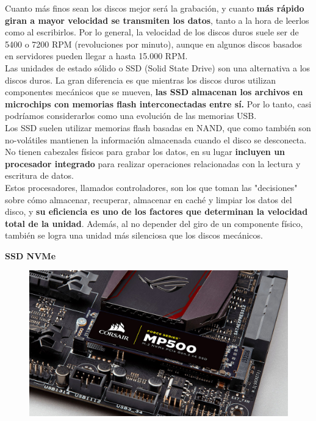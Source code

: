 \documentclass[10pt,letterpaper]{article}
\begin{document}
\begin{justify}
	\noindent
	Cuanto más finos sean los discos mejor será la grabación, y cuanto \textbf{más rápido giran a mayor velocidad se transmiten los datos}, tanto a la hora de leerlos como al escribirlos. Por lo general, la velocidad de los discos duros suele ser de 5400 o 7200 RPM (revoluciones por minuto), aunque en algunos discos basados en servidores pueden llegar a hasta 15.000 RPM. \\
	
	\noindent
	Las unidades de estado sólido o SSD (Solid State Drive) son una alternativa a los discos duros. La gran diferencia es que mientras los discos duros utilizan componentes mecánicos que se mueven, \textbf{las SSD almacenan los archivos en microchips con memorias flash interconectadas entre sí.} Por lo tanto, casi podríamos considerarlos como una evolución de las memorias USB. \\
	
	\noindent
	Los SSD suelen utilizar memorias flash basadas en NAND, que como también son no-volátiles mantienen la información almacenada cuando el disco se desconecta. No tienen cabezales físicos para grabar los datos, en su lugar \textbf{incluyen un procesador integrado} para realizar operaciones relacionadas con la lectura y escritura de datos. \\
	
	\noindent
	Estos procesadores, llamados controladores, son los que toman las "decisiones" sobre cómo almacenar, recuperar, almacenar en caché y limpiar los datos del disco, y \textbf{su eficiencia es uno de los factores que determinan la velocidad total de la unidad}. Además, al no depender del giro de un componente físico, también se logra una unidad más silenciosa que los discos mecánicos.\\
	
	\begin{flushleft}
		\textbf{SSD NVMe}
	\end{flushleft}
	
	\begin{figure}[h]
		\centering
		\includegraphics[scale=0.18]{images/ssd.jpg}
	\end{figure}
	

\end{justify}
\end{document}
